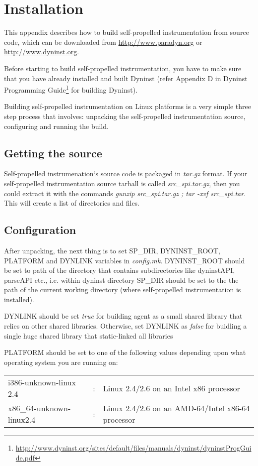 \section{Installation}
This appendix describes how to build self-propelled instrumentation
from source code, which can be downloaded from \url{http://www.paradyn.org}
or \url{http://www.dyninst.org}.

Before starting to build self-propelled instrumentation, you have to make sure
that you have already installed and built Dyninst (refer Appendix D in Dyninst
Programming
Guide\footnote{\url{http://www.dyninst.org/sites/default/files/manuals/dyninst/dyninstProgGuide.pdf}
} for building Dyninst).

Building self-propelled instrumentation on Linux platforms is a very simple
three step process that involves: unpacking the self-propelled instrumentation
source, configuring and running the build.

\subsection{Getting the source}
Self-propelled instrumenation`s source code is packaged in \textit{tar.gz}
format. If your self-propelled instrumentation source tarball is called
\textit{src\_spi.tar.gz}, then you could extract it with the commands
\textit{gunzip src\_spi.tar.gz ; tar -xvf src\_spi.tar}. This will create a list
of directories and files.

\subsection{Configuration}
After unpacking, the next thing is to set SP\_DIR, DYNINST\_ROOT, PLATFORM and
DYNLINK variables in \textit{config.mk}.  DYNINST\_ROOT should be set to path of
the directory that contains subdirectories like dyninstAPI, parseAPI etc.,
i.e. within dyninst directory SP\_DIR should be set to the the path of the
current working directory (where self-propelled instrumentation is
installed).

DYNLINK should be set \textit{true} for building agent as a small shared library
that relies on other shared libraries. Otherwise, set DYNLINK as \textit{false}
for buidling a single huge shared library that static-linked all libraries

PLATFORM should be set to one of the following values depending upon what
operating system you are running on:
\begin{table}[h]
\begin{tabular}{l c l}
 i386-unknown-linux 2.4  & : & Linux 2.4/2.6 on an Intel x86 processor \\
 x86\_64-unknown-linux2.4&: &Linux 2.4/2.6 on an AMD-64/Intel x86-64  processor \\
\end{tabular}
\end{table}

